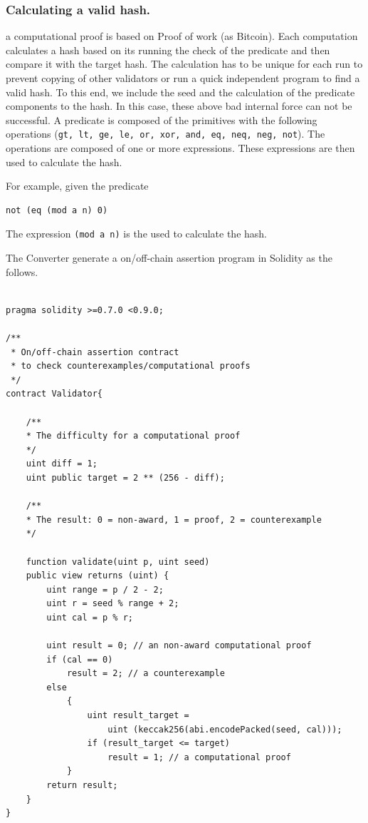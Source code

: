 \documentclass[runningheads]{llncs}
\begin{document}
\subsubsection{Calculating a valid hash.} a computational proof is based on Proof of work (as Bitcoin). Each computation calculates a hash based on its running the check of the predicate and then compare it with the target hash. The calculation has to be unique for each run to prevent copying of other validators or run a quick independent program to find a valid hash. To this end, we include the seed and the calculation of the predicate components to the hash. In this case, these above bad internal force can not be successful. A predicate is composed of the primitives with the following operations (\texttt{gt, lt, ge, le, or, xor, and, eq, neq, neg, not}). The operations are composed of one or more expressions. These expressions are then used to calculate the hash.

For example, given the predicate 

\begin{lstlisting}[numbers=none]
not (eq (mod a n) 0)
\end{lstlisting}

\noindent The expression \texttt{(mod a n)} is the used to calculate the hash.

The Converter generate a on/off-chain assertion program in Solidity as the follows.

\begin{lstlisting}[numbers=none]

pragma solidity >=0.7.0 <0.9.0;

/**
 * On/off-chain assertion contract 
 * to check counterexamples/computational proofs
 */
contract Validator{

    /**
    * The difficulty for a computational proof
    */
    uint diff = 1;
    uint public target = 2 ** (256 - diff); 

    /**
    * The result: 0 = non-award, 1 = proof, 2 = counterexample
    */

    function validate(uint p, uint seed) 
    public view returns (uint) {
        uint range = p / 2 - 2; 
        uint r = seed % range + 2;
        uint cal = p % r;

        uint result = 0; // an non-award computational proof 
        if (cal == 0)  
            result = 2; // a counterexample
        else 
            {
                uint result_target = 
                    uint (keccak256(abi.encodePacked(seed, cal)));
                if (result_target <= target) 
                    result = 1; // a computational proof    
            }
        return result;           
    }
}

\end{lstlisting}
\end{document}
